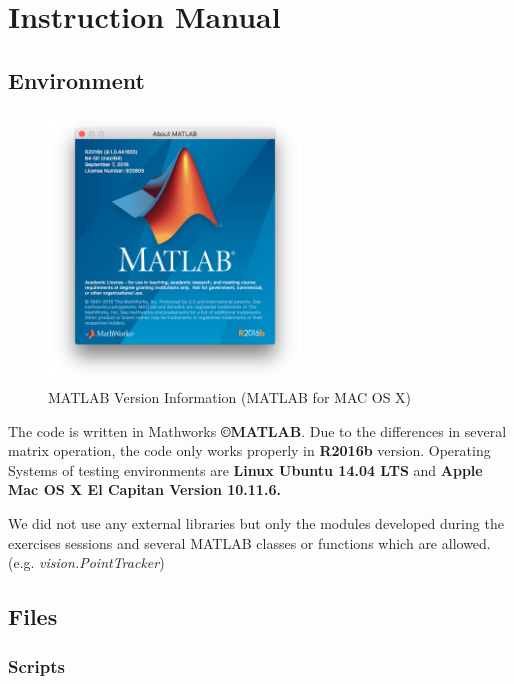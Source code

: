 \newcommand{\package}{\emph}

\setcounter{chapter}{-1}
\chapter{Instruction Manual}

\section{Environment}

\begin{figure}[h]
\centering
\includegraphics[width=0.6\textwidth]{aboutMatlab.png}
\caption{MATLAB Version Information (MATLAB for MAC OS X)}
\end{figure}

The code is written in Mathworks \textbf{\copyright MATLAB}. Due to the differences in several matrix operation, the code only works properly in \textbf{R2016b} version. Operating Systems of testing environments are \textbf{Linux Ubuntu 14.04 LTS} and \textbf{Apple Mac OS X El Capitan Version 10.11.6.}

We did not use any external libraries but only the modules developed during the exercises sessions and several MATLAB classes or functions which are allowed. (e.g. \textit{vision.PointTracker})

\section{Files}
\subsection*{Scripts}

